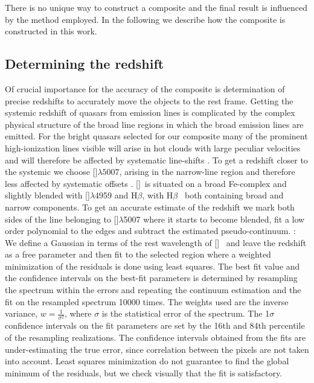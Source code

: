 \documentclass{aa}    %
\newcommand{\sectlabel}[1]{\label{sect:#1}}
\newcommand{\hb}{H$\beta$}
\newcommand{\oiii}{[\ion{O}{iii}]}
\newcommand{\todo}[3]{{\color{#2}\emph{#1}: #3}}
\newcommand{\changed}[1]{\todo{}{green}{#1}}
\begin{document}
There is no unique way to construct a composite and the final result is influenced by the method employed. In the following we describe how the composite is constructed in this work.

\subsection{Determining the redshift}  \sectlabel{redshifts}

Of crucial importance for the accuracy of the composite is determination of precise redshifts to accurately move the objects to the rest frame. Getting the systemic redshift of quasars from emission lines is complicated by the complex physical structure of the broad line regions in which the broad emission lines are emitted. For the bright quasars selected for our composite many of the prominent high-ionization lines visible will arise in hot clouds with large peculiar velocities and will therefore be affected by systematic line-shifts \citep{Tytler1992, Richards2002b, Gaskell2013}. To get a redshift closer to the systemic we choose \oiii$\lambda5007$,  arising in the narrow-line region and therefore less affected by systematic offsets \citep{Hewett2010}. \oiii~is situated on a broad Fe-complex and slightly blended with \oiii$\lambda$4959 and \hb, with \hb~ both containing broad and narrow components. 
To get an accurate estimate of the redshift we mark both sides of the line belonging to \oiii$\lambda$5007 where it starts to become blended, fit a low order polynomial to the edges and subtract the estimated pseudo-continuum. 
\changed{
We define a Gaussian in terms of the rest wavelength of \oiii~ and leave the redshift as a free parameter and then fit to the selected region where a weighted minimization of the residuals is done using least squares. The best fit value and the confidence intervals on the best-fit parameters is determined by resampling the spectrum within the errors and repeating the continuum estimation and the fit on the resampled spectrum 10000 times. The weights used are the inverse variance, $ w =  \frac{1}{\sigma^2}$, where $\sigma$ is the statistical error of the spectrum. The 1$\sigma$ confidence intervals on the fit parameters are set by the 16th and 84th percentile of the resampling realizations. The confidence intervals obtained from the fits are under-estimating the true error, since correlation between the pixels are not taken into account. Least squares minimization do not guarantee to find the global minimum of the residuals, but we check visually that the fit is satisfactory.}
\end{document}
